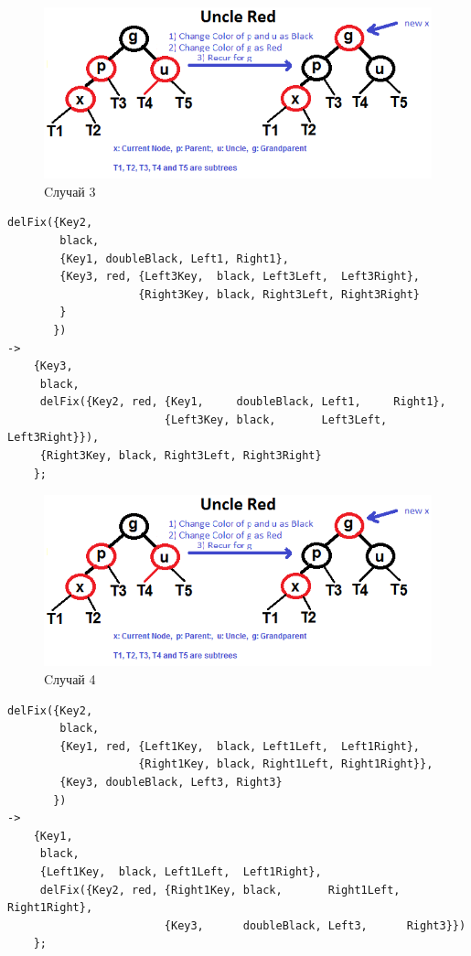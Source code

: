 			\begin{figure}[H]
				\centering
				\includegraphics[width=\textwidth]{img/tan-aus.png}
				\caption{Cлучай 3}
			\end{figure}
			\begin{lstlisting}
delFix({Key2, 														   											
	    black, 														   				
	    {Key1, doubleBlack, Left1, Right1}, 						   				
	    {Key3, red, {Left3Key,  black, Left3Left,  Left3Right}, 	   				
	                {Right3Key, black, Right3Left, Right3Right}		   				
	    }															   				
	   })															   				
->																	   				
	{Key3, 															   				
	 black, 														   				
	 delFix({Key2, red, {Key1,     doubleBlack, Left1, 	   Right1},    				
	 					{Left3Key, black, 		Left3Left, Left3Right}}),			 
	 {Right3Key, black, Right3Left, Right3Right} 									
	};																				
			\end{lstlisting}
			
			\begin{figure}[H]
				\centering
				\includegraphics[width=\textwidth]{img/tan-aus.png}
				\caption{Cлучай 4}
			\end{figure}
			\begin{lstlisting}
delFix({Key2,																		
   	    black,																		
   	    {Key1, red, {Left1Key,  black, Left1Left,  Left1Right},						
   	                {Right1Key, black, Right1Left, Right1Right}},					
   	    {Key3, doubleBlack, Left3, Right3}											
   	   })																			
->																					
	{Key1,																			
	 black,																										
	 {Left1Key,  black, Left1Left,  Left1Right},									
	 delFix({Key2, red, {Right1Key, black, 		 Right1Left, Right1Right},			
	 					{Key3, 		doubleBlack, Left3, 	 Right3}})				
	};																				
			\end{lstlisting}
			
